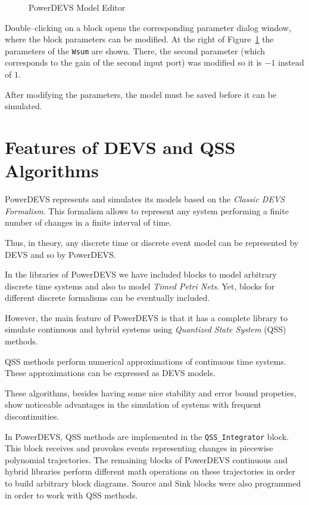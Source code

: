 \begin{figure}[h]
 \caption{PowerDEVS Model Editor}
 \label{fig:pdmodeling}
\end{figure}

Double--clicking on a block opens the corresponding parameter dialog window, where the block parameters can be modified. At the right of Figure~\ref{fig:pdmodeling} the parameters of the \verb"Wsum" are shown. There, the second parameter (which corresponds to the gain of the second input port) was modified so it is $-1$ instead of $1$.

After modifying the parameters, the model must be saved before it can be simulated. 

\section{Features of DEVS and QSS Algorithms}
PowerDEVS represents and simulates its models based on the \emph{Classic DEVS Formalism}. This formalism allows to represent any system performing a finite number of changes in a finite interval of time.

Thus, in theory, any discrete time or discrete event model can be represented by DEVS and so by PowerDEVS.

In the libraries of PowerDEVS we have included blocks to model arbitrary discrete time systems and also to model \emph{Timed Petri Nets}. Yet, blocks for different discrete formalisms can be eventually included.

However, the main feature of PowerDEVS is that it has a complete library to simulate continuous and hybrid systems using \emph{Quantized State System} (QSS) methods.

QSS methods perform numerical approximations of continuous time systems. These approximations can be expressed as DEVS models.

These algorithms, besides having some nice stability and error bound propeties, show noticeable advantages in the simulation of systems with frequent discontinuities.

In PowerDEVS, QSS methods are implemented in the \verb"QSS_Integrator" block. This block receives and provokes events representing changes in piecewise polynomial trajectories. The remaining blocks of PowerDEVS continuous and hybrid libraries perform different math operations on these trajectories in order to build arbitrary block diagrams. Source and Sink blocks were also programmed in order to work with QSS methods. 



